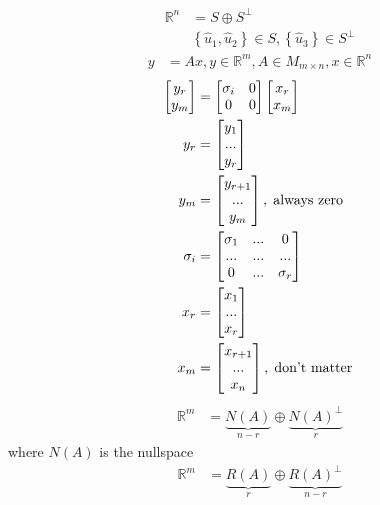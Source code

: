 \documentclass{article}
\begin{document}
\begin{align*}
\mathbb{R}^{n} &= S \oplus S^{\bot}
\\ &  \left\{\hat{u}_{1}, \hat{u}_{2}\right\} \in S, \left\{\hat{u}_{3}\right\} \in S^{\bot}
\end{align*}
\begin{align*}
y  &= A x, y \in \mathbb{R}^{m}, A \in M_{m \times n}, x \in \mathbb{R}^{n}
\end{align*}
\begin{align*}
\begin{bmatrix} y_{r} \\ y_{m} \end{bmatrix} &= \begin{bmatrix} \sigma_{i} & 0 \\ 0 & 0 \end{bmatrix} \begin{bmatrix} x_{r} \\ x_{m} \end{bmatrix}
\\ y_{r} &= \begin{bmatrix} y_{1} \\ ... \\ y_{r} \end{bmatrix}
\\ y_{m} &= \begin{bmatrix} y_{r+1} \\ ... \\ y_{m} \end{bmatrix}, \text{\;always zero\;}
\\ \sigma_{i} &= \begin{bmatrix} \sigma_{1} & ... & 0 \\ ... & ... & ... \\ 0 & ... & \sigma_{r} \end{bmatrix}
\\ x_{r} &= \begin{bmatrix} x_{1} \\ ... \\ x_{r} \end{bmatrix}
\\ x_{m} &= \begin{bmatrix} x_{r+1} \\ ... \\ x_{n} \end{bmatrix}, \text{\;don't matter\;}
\end{align*}
\begin{align*}
\mathbb{R}^{m} &= \underbrace{N\left(A\right)}_{n - r} \oplus \underbrace{N\left(A\right)^{\bot}}_{r }
\end{align*}
where $N\left(A\right) $ is the nullspace
\begin{align*}
\mathbb{R}^{m} &= \underbrace{R\left(A\right)}_{r} \oplus \underbrace{R\left(A\right)^{\bot}}_{n - r}
\end{align*}
\end{document}
